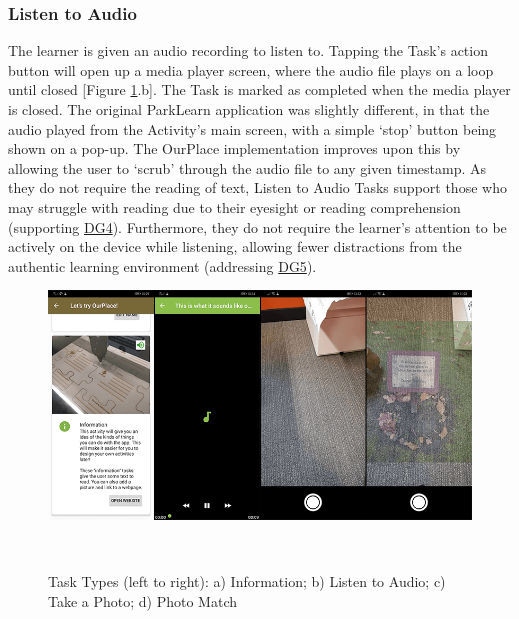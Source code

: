 \subsubsection*{Listen to Audio}
The learner is given an audio recording to listen to. Tapping the Task's action button will open up a media player screen, where the audio file plays on a loop until closed [Figure \ref{fig:TaskTypes1}.b]. The Task is marked as completed when the media player is closed. The original ParkLearn application was slightly different, in that the audio played from the Activity's main screen, with a simple `stop' button being shown on a pop-up. The OurPlace implementation improves upon this by allowing the user to `scrub' through the audio file to any given timestamp. As they do not require the reading of text, Listen to Audio Tasks support those who may struggle with reading due to their eyesight or reading comprehension (supporting \hyperref[DG4]{DG4}). Furthermore, they do not require the learner's attention to be actively on the device while listening, allowing fewer distractions from the authentic learning environment (addressing \hyperref[DG5]{DG5}).

\begin{figure}
  \centering
  \includegraphics[width=1\columnwidth]{images/chapter05/tasktypes1.png}
  \caption[Task Types (part 1)]{Task Types (left to right): a) Information; b) Listen to Audio; c) Take a Photo; d) Photo Match}~\label{fig:TaskTypes1}
\end{figure}
    
